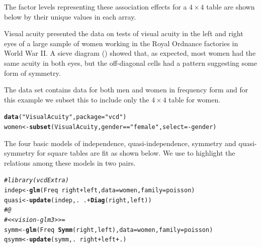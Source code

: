\documentclass[11pt]{book}\usepackage[]{graphicx}\usepackage[]{color}
\makeatletter
\newcommand{\hlstr}[1]{\textcolor[rgb]{0.192,0.494,0.8}{#1}}%
\newcommand{\hlcom}[1]{\textcolor[rgb]{0.678,0.584,0.686}{\textit{#1}}}%
\newcommand{\hlopt}[1]{\textcolor[rgb]{0,0,0}{#1}}%
\newcommand{\hlstd}[1]{\textcolor[rgb]{0.345,0.345,0.345}{#1}}%
\newcommand{\hlkwb}[1]{\textcolor[rgb]{0.69,0.353,0.396}{#1}}%
\newcommand{\hlkwc}[1]{\textcolor[rgb]{0.333,0.667,0.333}{#1}}%
\newcommand{\hlkwd}[1]{\textcolor[rgb]{0.737,0.353,0.396}{\textbf{#1}}}%
\newenvironment{kframe}{%
 \def\at@end@of@kframe{}%
 \ifinner\ifhmode%
  \def\at@end@of@kframe{\end{minipage}}%
  \begin{minipage}{\columnwidth}%
 \fi\fi%
 \def\FrameCommand##1{\hskip\@totalleftmargin \hskip-\fboxsep
 \colorbox{shadecolor}{##1}\hskip-\fboxsep
     \hskip-\linewidth \hskip-\@totalleftmargin \hskip\columnwidth}%
 \MakeFramed {\advance\hsize-\width
   \@totalleftmargin\z@ \linewidth\hsize
   \@setminipage}}%
 {\par\unskip\endMakeFramed%
 \at@end@of@kframe}
\newenvironment{knitrout}{}{} %
\renewenvironment{knitrout}{\small\renewcommand{\baselinestretch}{.85}}{} %
\makeatother
\begin{document}
The factor levels representing these association effects for a $4 \times 4$ table
are shown below by their unique values in each array.


\begin{Example}{Visual acuity}
 presented the data on tests of visual acuity in the left and right eyes
of a large sample of women working in the Royal Ordnance factories in World War II.
A sieve diagram () showed that, as expected, most women had the
same acuity in both eyes, but the off-diagonal cells had a pattern suggesting some form
of symmetry.

The data set  contains data for both men and women in frequency form
and for this example we subset this to include only the $4 \times 4$ table for women.
\begin{knitrout}
\color{fgcolor}\begin{kframe}
\begin{alltt}
\hlkwd{data}\hlstd{(}\hlstr{"VisualAcuity"}\hlstd{,} \hlkwc{package}\hlstd{=}\hlstr{"vcd"}\hlstd{)}
\hlstd{women} \hlkwb{<-} \hlkwd{subset}\hlstd{(VisualAcuity, gender}\hlopt{==}\hlstr{"female"}\hlstd{,} \hlkwc{select}\hlstd{=}\hlopt{-}\hlstd{gender)}
\end{alltt}
\end{kframe}
\end{knitrout}
The four basic models of independence, quasi-independence, symmetry and quasi-symmetry
for square tables are fit as shown below.  We use  to highlight
the relations among these models in two pairs.
\begin{knitrout}
\color{fgcolor}\begin{kframe}
\begin{alltt}
\hlcom{#library(vcdExtra)}
\hlstd{indep} \hlkwb{<-} \hlkwd{glm}\hlstd{(Freq} \hlopt{~} \hlstd{right} \hlopt{+} \hlstd{left,}  \hlkwc{data} \hlstd{= women,} \hlkwc{family} \hlstd{= poisson)}
\hlstd{quasi} \hlkwb{<-} \hlkwd{update}\hlstd{(indep, .} \hlopt{~} \hlstd{.} \hlopt{+} \hlkwd{Diag}\hlstd{(right, left))}
\hlcom{# @}
\hlcom{# <<vision-glm3>>=}
\hlstd{symm} \hlkwb{<-} \hlkwd{glm}\hlstd{(Freq} \hlopt{~} \hlkwd{Symm}\hlstd{(right, left),} \hlkwc{data} \hlstd{= women,} \hlkwc{family} \hlstd{= poisson)}
\hlstd{qsymm} \hlkwb{<-} \hlkwd{update}\hlstd{(symm, .} \hlopt{~} \hlstd{right} \hlopt{+} \hlstd{left} \hlopt{+} \hlstd{.)}
\end{alltt}

\end{kframe}
\end{knitrout}
\end{Example}
\end{document}
